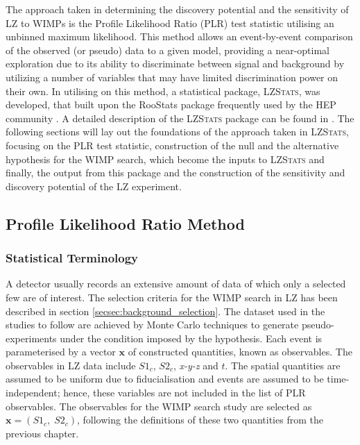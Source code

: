 The approach taken in determining the discovery potential and the sensitivity of LZ to WIMPs is the Profile Likelihood Ratio (PLR) test statistic \cite{Rolke_2005} utilising an unbinned maximum likelihood. This method allows an event-by-event comparison of the observed (or pseudo) data to a given model, providing a near-optimal exploration due to its ability to discriminate between signal and background by utilizing a number of variables that may have limited discrimination power on their own. In utilising on this method, a statistical package, \textsc{LZStats}, was developed, that built upon the RooStats package frequently used by the HEP community \cite{moneta2010roostats}. A detailed description of the \textsc{LZStats} package can be found in \cite{ibles}. The following sections will lay out the foundations of the approach taken in \textsc{LZStats}, focusing on the PLR test statistic, construction of the null and the alternative hypothesis for the WIMP search, which become the inputs to \textsc{LZStats} and finally, the output from this package and the construction of the sensitivity and discovery potential of the LZ experiment.


\subsection{Profile Likelihood Ratio Method}
\label{secsec:statistical_terminology}

\subsubsection{Statistical Terminology}

A detector usually records an extensive amount of data of which only a selected few are of interest. The selection criteria for the WIMP search in LZ has been described in section \ref{secsec:background_selection}. The dataset used in the studies to follow are achieved by Monte Carlo techniques to generate pseudo-experiments under the condition imposed by the hypothesis. Each event is parameterised by a vector $\pmb{x}$ of constructed quantities, known as observables. The observables in LZ data include $S1_{c}$, $S2_{c}$, \textit{x-y-z} and $t$. The spatial quantities are assumed to be uniform due to fiducialisation and events are assumed to be time-independent; hence, these variables are not included in the list of PLR observables. The observables for the WIMP search study are selected as $\pmb{x} = (S1_{c}, \; S2_{c})$, following the definitions of these two quantities from the previous chapter.

